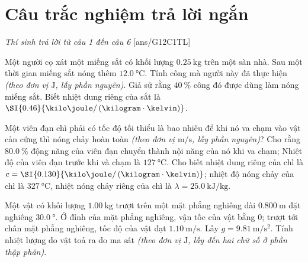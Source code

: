 \section{Câu trắc nghiệm trả lời ngắn} \textit{Thí sinh trả lời từ câu 1 đến câu 6}
\setcounter{ex}{0}
[ans/G12C1TL]
\begin{ex}
	Một người cọ xát một miếng sắt có khối lượng $\SI{0.25}{\kilogram}$ trên một sàn nhà. Sau một thời gian miếng sắt nóng thêm $\SI{12.0}{\celsius}$. Tính công mà người này đã thực hiện \textit{(theo đơn vị $\si{\joule}$, lấy phần nguyên)}. Giả sử rằng $\SI{40}{\percent}$ công đó được dùng làm nóng miếng sắt. Biết nhiệt dung riêng của sắt là $\SI{0.46}{\kilo\joule/\left(\kilogram\cdot\kelvin\right)}$.
\end{ex}
\begin{ex}
	Một viên đạn chì phải có tốc độ tối thiểu là bao nhiêu để khi nó va chạm vào vật cản cứng thì nóng chảy hoàn toàn \textit{(theo đơn vị $\si{\meter/\second}$, lấy phần nguyên)}? Cho rằng $\SI{80.0}{\percent}$ động năng của viên đạn chuyển thành nội năng của nó khi va chạm; Nhiệt độ của viên đạn trước khi và chạm là $\SI{127}{\celsius}$. Cho biết nhiệt dung riêng của chì là $c=\SI{0.130}{\kilo\joule/\left(\kilogram\cdot\kelvin\right)}$; nhiệt độ nóng chảy của chì là $\SI{327}{\celsius}$, nhiệt nóng chảy riêng của chì là $\lambda=\SI{25.0}{\kilo\joule/\kilogram}$.
	\end{ex}
\begin{ex}
	Một vật có khối lượng $\SI{1.00}{\kilogram}$ trượt trên một mặt phẳng nghiêng dài $\SI{0.800}{\meter}$ đặt nghiêng $\SI{30.0}{\degree}$. Ở đỉnh của mặt phẳng nghiêng, vận tốc của vật bằng 0; trượt tới chân mặt phẳng nghiêng, tốc độ của vật đạt $\SI{1.10}{\meter/\second}$. Lấy $g=\SI{9.81}{\meter/\second^2}$. Tính nhiệt lượng do vật toả ra do ma sát \textit{(theo đơn vị $\si{\joule}$, lấy đến hai chữ số ở phần thập phân)}.
\end{ex}
